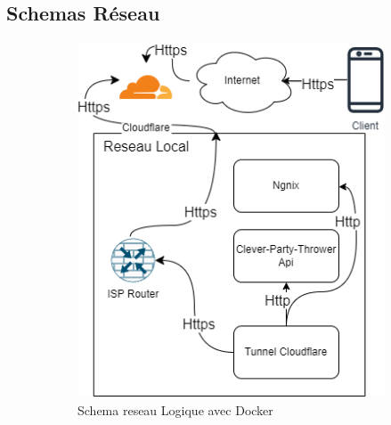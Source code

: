 \subsection{Schemas Réseau}\label{subsec:schemas-reseau}

\begin{figure}[H]
    \centering
    \begin{subfigure}[b]{0.45\textwidth}
        \includegraphics[width=\textwidth]{./images/shemaReseauDocker.drawio}
        \caption{Schema reseau Logique avec Docker}
        \label{fig:schemaDocker}
    \end{subfigure}
    \hfill
    \begin{subfigure}[b]{0.45\textwidth}

\end{subfigure}
\end{figure}
